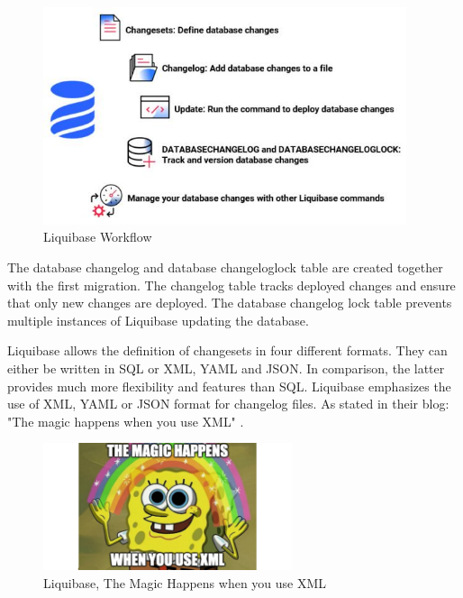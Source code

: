 %
\begin{figure}[H]
	\centering
	\includegraphics[width=0.95\textwidth]{./chapters/intro_liquibase/images/how-liquibase-works-general.jpg}
	\caption[Liquibase Workflow - Source: \cite{Liquibase}]{Liquibase Workflow}
	\label{fig:IntroductionToLiquibase:Workflow}
\end{figure}

The database changelog and database changeloglock table are created together with the first migration. The changelog table tracks deployed changes and ensure that only new changes are deployed.
The database changelog lock table prevents multiple instances of Liquibase updating the database.

%
Liquibase allows the definition of changesets in four different formats. They can either be written in SQL or XML, YAML and JSON. In comparison, the latter provides much more flexibility and features than SQL. Liquibase emphasizes the use of XML, YAML or JSON format for changelog files. As stated in their blog: "The magic happens when you use XML" \cite{LiquibaseBlogXML}.

\begin{figure}[H]
	\centering
	\includegraphics[width=0.65\textwidth]{./chapters/intro_liquibase/images/xml-magic.png}
	\caption[Liquibase, The Magic Happens when you use XML - Source: \cite{LiquibaseBlogXML}]{Liquibase, The Magic Happens when you use XML}
	\label{fig:IntroductionToLiquibase:Magic}
\end{figure}

